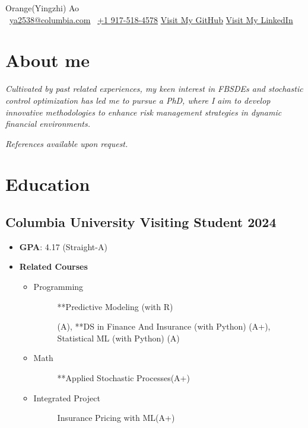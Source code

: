 \documentclass[a4paper]{article}
\newcommand{\org}{\color{org}}
\begin{document}
\begin{center}      
    {\fontsize{28}{28}\selectfont Orange(Yingzhi) Ao} \\ \vspace{5pt}
    {\org\faEnvelope[regular]}\ \href{mailto:ya2538@columbia.edu}{ya2538@columbia.com} \hfill
    {\org{}}\ \href{tel:+1 9175184578}{+1 917-518-4578} \hfill
    {\org\faGithub} \href{https://github.com/OrangeAoo}{Visit My GitHub}  \hfill
    {\org\faLinkedin} \href{http://linkedin.com/in/orange-ao}{Visit My LinkedIn}
\end{center}

\section{About me}  %

\textit{Cultivated by past related experiences, my keen interest in FBSDEs and stochastic control optimization has led me to pursue a PhD, where I aim to develop innovative methodologies to enhance risk management strategies in dynamic financial environments.}

{\org \itshape References available upon request.}

\section{Education}  %

\subsection{Columbia University  \normalfont \hfill Visiting Student \hfill 2024}
\begin{itemize}
    \item \textbf{GPA}: 4.17 (Straight-A)
    \item \textbf{Related Courses}
    \begin{itemize}
        \item\begin{description}
            \item[Programming] \hypertarget{PM}{**Predictive Modeling (with R)}(A), **DS in Finance And Insurance (with Python) (A+), Statistical ML (with Python) (A)
        \end{description}
        \item\begin{description}
            \item[Math] **Applied Stochastic Processes(A+)
        \end{description}
        \item\begin{description}
            \item[Integrated Project] Insurance Pricing with ML(A+)
        \end{description} 
    \end{itemize} 
\end{itemize}
\end{document}
